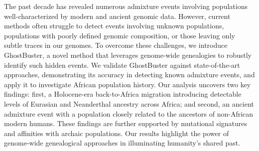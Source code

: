 
The past decade has revealed numerous admixture events involving populations well-characterized by modern and ancient genomic data. However, current methods often struggle to detect events involving unknown populations, populations with poorly defined genomic composition, or those leaving only subtle traces in our genomes. To overcome these challenges, we introduce GhostBuster, a novel method that leverages genome-wide genealogies to robustly identify such hidden events. We validate GhostBuster against state-of-the-art approaches, demonstrating its accuracy in detecting known admixture events, and apply it to investigate African population history. Our analysis uncovers two key findings: first, a Holocene-era back-to-Africa migration introducing detectable levels of Eurasian and Neanderthal ancestry across Africa; and second, an ancient admixture event with a population closely related to the ancestors of non-African modern humans. These findings are further supported by mutational signatures and affinities with archaic populations. Our results highlight the power of genome-wide genealogical approaches in illuminating humanity's shared past.

